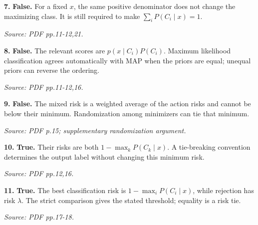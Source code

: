 \documentclass[11pt,a4paper]{article}
\begin{document}
\par\noindent\begin{minipage}{\linewidth}
\textbf{7.} \textbf{False.} For a fixed \(x\), the same positive denominator does not change the maximizing class. It is still required to make \(\sum_iP(C_i\mid x)=1\).

{\footnotesize\textit{Source: PDF pp.11-12,21.}}
\end{minipage}\par\vspace{3mm}
\par\noindent\begin{minipage}{\linewidth}
\textbf{8.} \textbf{False.} The relevant scores are \(p(x\mid C_i)P(C_i)\). Maximum likelihood classification agrees automatically with MAP when the priors are equal; unequal priors can reverse the ordering.

{\footnotesize\textit{Source: PDF pp.11-12,16.}}
\end{minipage}\par\vspace{3mm}
\par\noindent\begin{minipage}{\linewidth}
\textbf{9.} \textbf{False.} The mixed risk is a weighted average of the action risks and cannot be below their minimum. Randomization among minimizers can tie that minimum.

{\footnotesize\textit{Source: PDF p.15; supplementary randomization argument.}}
\end{minipage}\par\vspace{3mm}
\par\noindent\begin{minipage}{\linewidth}
\textbf{10.} \textbf{True.} Their risks are both \(1-\max_kP(C_k\mid x)\). A tie-breaking convention determines the output label without changing this minimum risk.

{\footnotesize\textit{Source: PDF pp.12,16.}}
\end{minipage}\par\vspace{3mm}
\par\noindent\begin{minipage}{\linewidth}
\textbf{11.} \textbf{True.} The best classification risk is \(1-\max_iP(C_i\mid x)\), while rejection has risk \(\lambda\). The strict comparison gives the stated threshold; equality is a risk tie.

{\footnotesize\textit{Source: PDF pp.17-18.}}
\end{minipage}\par\vspace{3mm}
\end{document}
